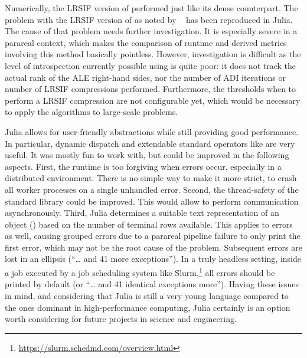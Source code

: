 Numerically, the \ac{LRSIF} version of  performed just like its dense counterpart.
The problem with the \ac{LRSIF} version of  as noted by \citeauthor*{Lang2015}~\cite{Lang2015,Lang2017} has been reproduced in Julia.
The cause of that problem needs further investigation.
It is especially severe in a parareal context,
which makes the comparison of runtime and derived metrics involving this method basically pointless.
However, investigation is difficult as the level of introspection
currently possible using  is quite poor:
it does not track the actual rank of the \ac{ALE} right-hand sides,
nor the number of \ac{ADI} iterations or number of \ac{LRSIF} compressions performed.
Furthermore, the thresholds when to perform a \ac{LRSIF} compression are not configurable yet,
which would be necessary to apply the algorithms to large-scale problems.

Julia allows for user-friendly abstractions while still providing good performance.
In particular, dynamic dispatch and extendable standard operators like \julia{(+)} are very useful.
It was mostly fun to work with, but could be improved in the following aspects.
First, the runtime is too forgiving when errors occur,
especially in a distributed environment.
There is no simple way to make it more strict, \eg to crash all worker processes on a single unhandled error.
Second, the thread-safety of the standard library could be improved.
This would allow  to perform communication asynchronously.
Third, Julia determines a suitable text representation of an object (\eg {}) based on the number of terminal rows available.
This applies to errors as well, causing \eg grouped errors due to a parareal pipeline failure to only print the first error,
which may not be the root cause of the problem.
Subsequent errors are lost in an ellipsis (\enquote{\ldots{} and 41 more exceptions}).
In a truly headless setting,
\eg inside a job executed by a job scheduling system like Slurm,\footnote{\url{https://slurm.schedmd.com/overview.html}}
all errors should be printed by default (or \enquote{\ldots{} and 41 identical exceptions more}).
Having these issues in mind,
and considering that Julia is still a very young language compared to the ones dominant in high-performance computing,
Julia certainly is an option worth considering for future projects in science and engineering.
